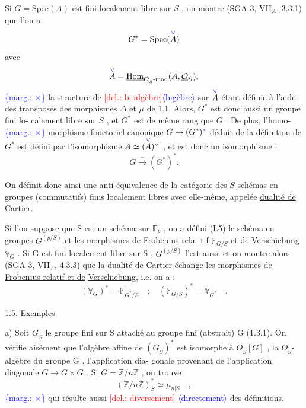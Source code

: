 \documentclass[11pt]{article}
\newcommand{\scanpage}[1]{\par\bigskip\noindent{\small\sffamily[scan #1]}\par}
\newcommand{\mspage}[1]{{\small\sffamily[p.\,#1]}}
\newcommand{\hand}[1]{\textcolor{blue}{#1}}
\newcommand{\inserted}[2][]{\textcolor{blue}{$\langle$#2$\rangle$}}
\newcommand{\margin}[1]{\textcolor{blue}{\{\textsf{marg.:} #1\}}}
\newcommand{\deleted}[1]{\textcolor{red}{[\textsf{del.:} #1]}}
\newcommand{\uline}[1]{\underline{#1}}
\begin{document}
Si $G = \mathrm{Spec}(A)$ est fini localement libre sur $S$ , on montre
(SGA 3, VII$_{A}$, 3.3.1) que l'on a
\[ G^{*} = \mathrm{Spec}(\overset{\hand{\vee}}{A}) \]
avec
\[ \overset{\hand{\vee}}{A} = \underline{\mathrm{Hom}}_{\underline{\mathcal{O}}_{S}\text{-mod}}(A,\underline{\mathcal{O}}_{S}) , \]
\margin{$\times$} la structure de \deleted{bi-algèbre}\inserted{bigèbre} sur $\overset{\hand{\vee}}{A}$ étant définie à l'aide des transposés des
morphismes $\Delta$ et $\mu$ de 1.1. Alors, $G^{*}$ est donc aussi un groupe fini lo-%
calement libre sur $S$ , et $G^{*}$ est de même rang que $G$ . De plus, l'homo-%
\margin{$\times$} morphisme fonctoriel canonique $G \to (G^{*})^{\hand{*}}$ déduit de la définition de $G^{*}$
est défini par l'isomorphisme $A \simeq (\overset{\hand{\vee}}{A})^{\vee}$ , et est donc un isomorphisme :
\[ G \overset{\sim}{\to} (G^{*})^{*} . \]

On définit donc ainsi une anti-équivalence de la catégorie des
$S$-schémas en groupes (commutatifs) finis localement libres avec elle-même,
appelée \uline{dualité de Cartier}.

\mspage{\hand{31}}

\clearpage
\scanpage{129/32}
\mspage{\hand{II.4}}

Si l'on suppose que  S  est un schéma sur  $\mathbb{F}_p$ , on a défini
(I.5) le schéma en groupes  $G^{(p/S)}$  et les morphismes de Frobenius rela-%
tif  $\mathbb{F}_{G/S}$  et de Verschiebung  $\mathbb{V}_G$ . Si  G  est fini localement libre sur
S , $G^{(p/S)}$  l'est aussi et on montre alors (SGA 3, VII$_A$, 4.3.3) que la
dualité de Cartier \uline{échange les morphismes de Frobenius relatif et de}
\uline{Verschiebung}, i.e. on a :
\[ (\mathbb{V}_G)^* = \mathbb{F}_{G^*/S} \quad ; \quad (\mathbb{F}_{G/S})^* = \mathbb{V}_{G^*} \quad . \]

1.5.   \uline{Exemples}

a) Soit  $\underline{G}_S$  le groupe fini sur  S  attaché au groupe fini
(abstrait)  G  (1.3.1). On vérifie aisément que l'algèbre affine de  $(\underline{G}_S)^*$
est isomorphe à  $\underline{O}_S[G]$ , la $\underline{O}_S$-algèbre du groupe  G , l'application dia-%
gonale provenant de l'application diagonale  $G \rightarrow G \times G$ . Si  $G = \mathbb{Z}/n\mathbb{Z}$ ,
on trouve
\[ (\mathbb{Z}/n\mathbb{Z})^*_S \simeq \mu_{n|S} \quad , \]
\margin{$\times$} qui résulte aussi \deleted{diversement} \inserted{directement} des définitions.
\end{document}
